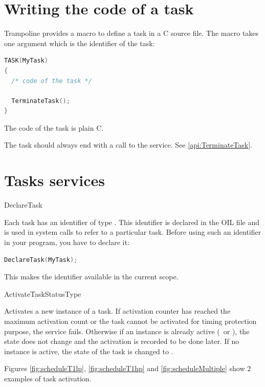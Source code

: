 \section{Writing the code of a task}

Trampoline provides a  macro to define a task in a C source file. The macro takes one argument which is the identifier of the task:

\begin{lstlisting}[language=C]
TASK(MyTask)
{
  /* code of the task */
  
  TerminateTask();
}
\end{lstlisting}

The code of the task is plain C.

The task should always end with a call to the  service. See \ref{api:TerminateTask}.


\section{Tasks services}

\begin{service}{DeclareTask}{}

Each task has an identifier of type . This identifier is declared in the OIL file and is used in system calls to refer to a particular task. Before using such an identifier in your program, you have to declare it:

\begin{lstlisting}[language=C]
DeclareTask(MyTask);
\end{lstlisting}

This makes the  identifier available in the current scope.


\end{service}

\begin{service}{ActivateTask}{StatusType}


Activates a new instance of a task. If activation counter has reached the maximum activation count or the task cannot be activated for timing protection purpose, the service fails. Otherwise if an instance is already active (\RUNNING\ or \READY), the state does not change and the activation is recorded to be done later. If no instance is active, the state of the task is changed to \READY.

Figures \ref{fig:scheduleT1lp}, \ref{fig:scheduleT1hp} and \ref{fig:scheduleMultiple} show 2 examples of task activation.

\end{service}

